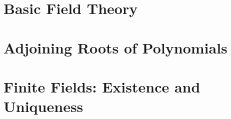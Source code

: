 \documentclass{../../notes_d}
\author{Arun Debray}
\date{\today}
\begin{document}
\frontstuff

\section{Basic Field Theory}
	
\section{Adjoining Roots of Polynomials}
	
\section{Finite Fields: Existence and Uniqueness}
	
\end{document}

